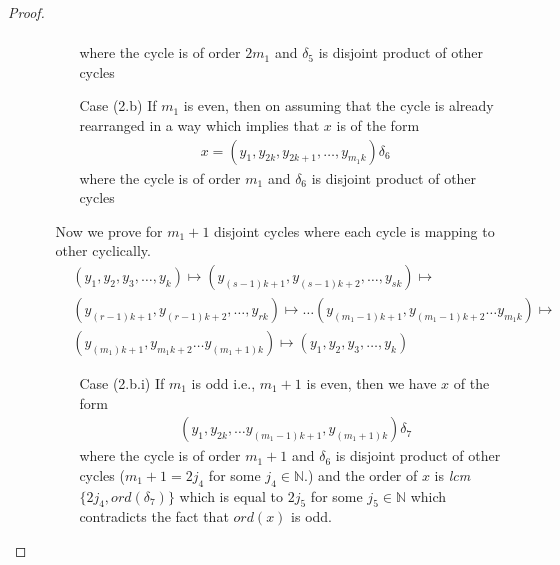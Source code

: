 \documentclass[10pt,a4paper]{amsart}
\newcommand{\ord}{ord}
\begin{document}
\begin{proof}
\begin{itemize}
\begin{itemize}
\begin{itemize}
\begin{align*}
                        \end{align*} where the cycle is of order $2m_1$ and $\delta_5$ is disjoint product of other cycles
                        \item[Case (2.b)] If $m_1$ is even, then on assuming that the cycle is already rearranged in a way which implies that $x$ is of the form
                        \begin{align*}
                            x = (y_1, y_{2k}, y_{2k + 1}, \ldots , y_{m_1k})\delta_6
                        \end{align*} where the cycle is of order $m_1$ and $\delta_6$ is disjoint product of other cycles
                    \end{itemize}
                    Now we prove for $m_1 + 1$ disjoint cycles where each cycle is mapping to other cyclically.
                    \begin{align*}
                        &(y_1, y_2, y_3, \ldots , y_k) \mapsto (y_{(s- 1)k + 1}, y_{(s- 1)k + 2}, \ldots , y_{sk})\mapsto \\
                        &(y_{(r- 1)k + 1}, y_{(r- 1)k + 2}, \ldots , y_{rk})\mapsto \ldots
                        (y_{(m_1- 1)k + 1}, y_{(m_1- 1)k + 2} \ldots y_{m_1k})\mapsto\\
                        & (y_{(m_1)k + 1}, y_{m_1k + 2} \ldots y_{(m_1 + 1)k})\mapsto (y_1, y_2, y_3, \ldots , y_k)
                    \end{align*}
                    \begin{itemize}
                        \item[Case (2.b.i)] If $m_1$ is odd i.e., $m_1 + 1$ is even, then we have $x$ of the form
                        \begin{align*}
                            (y_1, y_{2k}, \ldots y_{(m_1 - 1)k + 1}, y_{(m_1 + 1)k})\delta_7
                        \end{align*}where the cycle is of order $m_1 + 1$ and $\delta_6$ is disjoint product of other cycles ($m_1 + 1 = 2j_4$ for some $j_4 \in \mathbb{N}$.) and the order of $x$ is \textit{lcm}$\{2j_4, \ord(\delta_7)\}$ which is equal to $2j_5$ for some $j_5 \in \mathbb{N}$ which contradicts the fact that $\ord(x)$ is odd.
                        

\end{itemize}
\end{itemize}
\end{itemize}
\end{proof}
\end{document}
